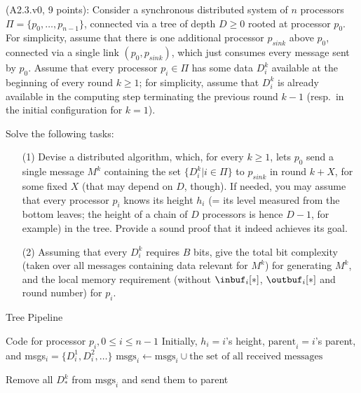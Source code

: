 
\begin{Exc}{(A2.3.v0, 9 points):}
Consider a synchronous distributed system of $n$ processors
$\Pi=\{p_0,\dots,p_{n-1}\}$, connected via a tree of depth $D\geq0$
rooted at processor $p_0$. For simplicity, assume that there is
one additional processor $p_{sink}$ above $p_0$, connected via a single link
$(p_0,p_{sink})$, which just consumes every message sent by $p_0$.
Assume that every processor $p_i\in\Pi$ has
some data $D_i^k$ available at the beginning of every round $k\geq 1$;
for simplicity, assume that $D_i^k$ is already available in the
computing step terminating the previous round $k-1$ (resp.\
in the initial configuration for $k=1$).

Solve the following tasks:
\begin{enumerate}
\item[(1)] Devise a distributed algorithm, which, for every $k\geq 1$,
lets $p_0$ send a single message $M^k$ containing the set
$\{D_i^k| i\in\Pi\}$ to $p_{sink}$ in
round $k+X$, for some fixed $X$ (that may depend on $D$, though).
If needed, you may assume that every processor $p_i$ knows its
height $h_i$ (= its level measured from the bottom leaves;
the height of a chain of $D$ processors is hence $D-1$, for example) in
the tree. Provide a sound proof that it indeed achieves its
goal.

\item[(2)] Assuming that every $D_i^k$ requires $B$ bits,
give the total bit
complexity (taken over all messages containing data relevant for
$M^k$) for generating $M^k$, and the local memory requirement
(without $\inbuf_i[*]$, $\outbuf_i[*]$ and round number) for $p_i$.
\end{enumerate}
\end{Exc}

\begin{algorithm}
\caption{Tree Pipeline} \label{alg:tpipe}
\begin{algorithmic}[1]
\Statex Code for processor $p_i, 0 \leq i \leq n - 1$
\Statex Initially, $h_i = i$'s height, $\text{parent}_i = i$'s parent,
       and msgs$_i = \{ D_i^1, D_i^2, \ldots \}$
    \State $\text{msgs}_i \gets \text{msgs}_i \cup \text{the set of all received messages}$

     \label{line:if}
        \State Remove all $D_*^k$ from $\text{msgs}_i$ and send them to parent \label{line:send}
    \EndIf
\EndFor
\end{algorithmic}
\end{algorithm}

